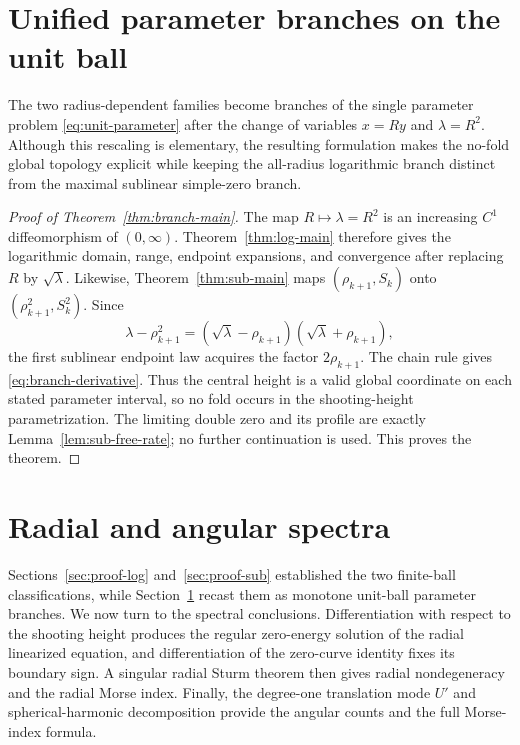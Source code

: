 \documentclass[11pt]{article}
\begin{document}
\section{Unified parameter branches on the unit ball}
\label{sec:parameter-branches}

The two radius-dependent families become branches of the single parameter
problem \eqref{eq:unit-parameter} after the change of variables
$x=Ry$ and $\lambda=R^2$. {Although this rescaling is elementary, the
resulting formulation makes the no-fold global topology explicit while
keeping the all-radius logarithmic branch distinct from the maximal sublinear
simple-zero branch.}

\begin{proof}[Proof of Theorem~\ref{thm:branch-main}]
The map $R\mapsto\lambda=R^2$ is an increasing $C^1$ diffeomorphism of
$(0,\infty)$. Theorem~\ref{thm:log-main} therefore gives the logarithmic
domain, range, endpoint expansions, and convergence after replacing $R$ by
$\sqrt\lambda$. Likewise, Theorem~\ref{thm:sub-main} maps
$(\rho_{k+1},S_k)$ onto $(\rho_{k+1}^2,S_k^2)$. Since
\[
 \lambda-\rho_{k+1}^2
 =(\sqrt\lambda-\rho_{k+1})(\sqrt\lambda+\rho_{k+1}),
\]
the first sublinear endpoint law acquires the factor $2\rho_{k+1}$.
The chain rule gives \eqref{eq:branch-derivative}. {Thus the central
height is a valid global coordinate on each stated parameter interval, so no
fold occurs in the shooting-height parametrization.} The limiting double zero
and its profile are exactly Lemma~\ref{lem:sub-free-rate}; no further
continuation is used. This proves the theorem.
\end{proof}


\section{Radial and angular spectra}
\label{sec:proof-morse}
{Sections~\ref{sec:proof-log} and~\ref{sec:proof-sub} established the
two finite-ball classifications, while Section~\ref{sec:parameter-branches}
recast them as monotone unit-ball parameter branches.  We now turn to the
spectral conclusions.  Differentiation with respect to the shooting height
produces the regular zero-energy solution of the radial linearized equation,
and differentiation of the zero-curve identity fixes its boundary sign.  A
singular radial Sturm theorem then gives radial nondegeneracy and the radial
Morse index.  Finally, the degree-one translation mode $U'$ and
spherical-harmonic decomposition provide the angular counts and the full
Morse-index formula.}
\end{document}
